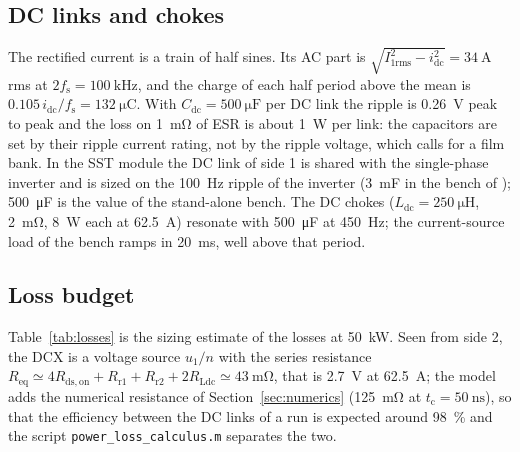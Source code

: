 \documentclass[12pt,a4paper]{scrartcl}
\newcommand{\ped}[1]{_{\mathrm{#1}}}
\newcommand{\code}[1]{\texttt{#1}}
\begin{document}
\begin{onehalfspace}
\subsection{DC links and chokes}
\label{sec:dclinks}

The rectified current is a train of half sines. Its AC part is $\sqrt{I\ped{1rms}^2 - i\ped{dc}^2} = \SI{34}{\ampere}$ rms at $2 f\ped{s} = \SI{100}{\kilo\hertz}$, and the charge of each half period above the mean is $0.105\,i\ped{dc}/f\ped{s} = \SI{132}{\micro\coulomb}$. With $C\ped{dc} = \SI{500}{\micro\farad}$ per DC link the ripple is \SI{0.26}{\volt} peak to peak and the loss on \SI{1}{\milli\ohm} of ESR is about \SI{1}{\watt} per link: the capacitors are set by their ripple current rating, not by the ripple voltage, which calls for a film bank. In the SST module the DC link of side 1 is shared with the single-phase inverter and is sized on the \SI{100}{\hertz} ripple of the inverter (\SI{3}{\milli\farad} in the bench of \cite{sst_doc}); \SI{500}{\micro\farad} is the value of the stand-alone bench. The DC chokes ($L\ped{dc} = \SI{250}{\micro\henry}$, \SI{2}{\milli\ohm}, \SI{8}{\watt} each at \SI{62.5}{\ampere}) resonate with \SI{500}{\micro\farad} at \SI{450}{\hertz}; the current-source load of the bench ramps in \SI{20}{\milli\second}, well above that period.

\subsection{Loss budget}
\label{sec:losses}

Table~\ref{tab:losses} is the sizing estimate of the losses at \SI{50}{\kilo\watt}. Seen from side 2, the DCX is a voltage source $u\ped{1}/n$ with the series resistance $R\ped{eq} \simeq 4 R\ped{ds,on} + R\ped{r1} + R\ped{r2} + 2 R\ped{Ldc} \simeq \SI{43}{\milli\ohm}$, that is \SI{2.7}{\volt} at \SI{62.5}{\ampere}; the model adds the numerical resistance of Section~\ref{sec:numerics} (\SI{125}{\milli\ohm} at $t\ped{c} = \SI{50}{\nano\second}$), so that the efficiency between the DC links of a run is expected around \SI{98}{\percent} and the script \code{power\_loss\_calculus.m} separates the two.


\end{onehalfspace}
\end{document}
